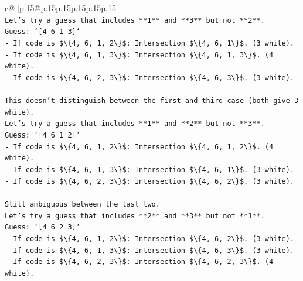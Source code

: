 \documentclass{article}
\begin{document}
{\begin{supertabular}{c@{$\;$}|p{.15\linewidth}@{}p{.15\linewidth}p{.15\linewidth}p{.15\linewidth}p{.15\linewidth}p{.15\linewidth}}
{{{\\ 
\texttt{Let's try a guess that includes **1** and **3** but not **2**.} \\
\texttt{Guess: `{[}4 6 1 3{]}`} \\
\texttt{{-} If code is \$\textbackslash{}\{4, 6, 1, 2\textbackslash{}\}\$: Intersection \$\textbackslash{}\{4, 6, 1\textbackslash{}\}\$. (3 white).} \\
\texttt{{-} If code is \$\textbackslash{}\{4, 6, 1, 3\textbackslash{}\}\$: Intersection \$\textbackslash{}\{4, 6, 1, 3\textbackslash{}\}\$. (4 white).} \\
\texttt{{-} If code is \$\textbackslash{}\{4, 6, 2, 3\textbackslash{}\}\$: Intersection \$\textbackslash{}\{4, 6, 3\textbackslash{}\}\$. (3 white).} \\
\\ 
\texttt{This doesn't distinguish between the first and third case (both give 3 white).} \\
\texttt{Let's try a guess that includes **1** and **2** but not **3**.} \\
\texttt{Guess: `{[}4 6 1 2{]}`} \\
\texttt{{-} If code is \$\textbackslash{}\{4, 6, 1, 2\textbackslash{}\}\$: Intersection \$\textbackslash{}\{4, 6, 1, 2\textbackslash{}\}\$. (4 white).} \\
\texttt{{-} If code is \$\textbackslash{}\{4, 6, 1, 3\textbackslash{}\}\$: Intersection \$\textbackslash{}\{4, 6, 1\textbackslash{}\}\$. (3 white).} \\
\texttt{{-} If code is \$\textbackslash{}\{4, 6, 2, 3\textbackslash{}\}\$: Intersection \$\textbackslash{}\{4, 6, 2\textbackslash{}\}\$. (3 white).} \\
\\ 
\texttt{Still ambiguous between the last two.} \\
\texttt{Let's try a guess that includes **2** and **3** but not **1**.} \\
\texttt{Guess: `{[}4 6 2 3{]}`} \\
\texttt{{-} If code is \$\textbackslash{}\{4, 6, 1, 2\textbackslash{}\}\$: Intersection \$\textbackslash{}\{4, 6, 2\textbackslash{}\}\$. (3 white).} \\
\texttt{{-} If code is \$\textbackslash{}\{4, 6, 1, 3\textbackslash{}\}\$: Intersection \$\textbackslash{}\{4, 6, 3\textbackslash{}\}\$. (3 white).} \\
\texttt{{-} If code is \$\textbackslash{}\{4, 6, 2, 3\textbackslash{}\}\$: Intersection \$\textbackslash{}\{4, 6, 2, 3\textbackslash{}\}\$. (4 white).} \\
}}}
\end{supertabular}}
\end{document}
